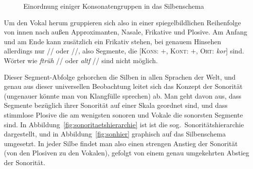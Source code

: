 \begin{figure}
  \centering
  \caption{Einordnung einiger Konsonatengruppen in das Silbenschema}
  \label{fig:silbenbau}
\end{figure}

Um den Vokal herum gruppieren sich also in einer spiegelbildlichen Reihenfolge von innen nach außen Approximanten, Nasale, Frikative und Plosive.
Am Anfang und am Ende kann zusätzlich ein Frikativ stehen, bei genauem Hinsehen allerdings nur // oder //, also Segmente, die [\textsc{Kons}: $+$, \textsc{Kont}: $+$, \textsc{Ort}: \textit{kor}] sind.
Wörter wie \textit{ftrüh} // oder \textit{altf} // sind nicht möglich.

Dieser Segment-Abfolge gehorchen die Silben in allen Sprachen der Welt, und genau aus dieser universellen Beobachtung leitet sich das Konzept der Sonorität (ungenauer könnte man von Klangfülle sprechen) ab.
Man geht davon aus, dass Segmente bezüglich ihrer Sonorität auf einer Skala geordnet sind, und dass stimmlose Plosive die am wenigsten sonoren und Vokale die sonorsten Segmente sind.
In Abbildung~\ref{fig:sonoritaetshierarchie} ist ist die sog.\ Sonoritätshierarchie dargestellt, und in Abbildung~\ref{fig:sonhier} graphisch auf das Silbenschema umgesetzt.
In jeder Silbe findet man also einen strengen Anstieg der Sonorität (von den Plosiven zu den Vokalen), gefolgt von einem genau umgekehrten Abstieg der Sonorität.


